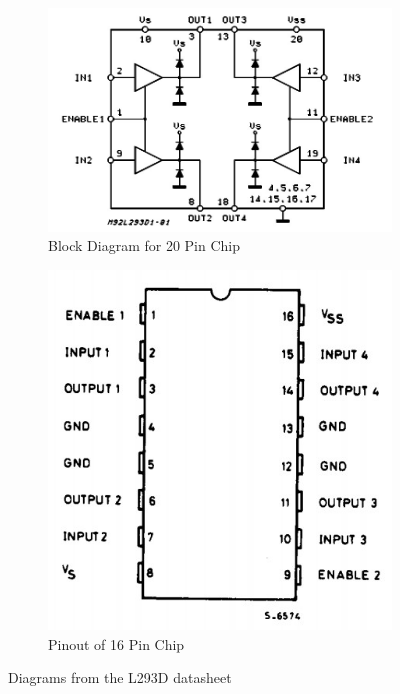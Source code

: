\documentclass[a4paper,12pt]{article}
\begin{document}
\begin{figure}[h]
    \centering
     \begin{subfigure}[b]{0.5\textwidth}
         \centering
         \includegraphics[width=\textwidth]{L293D-block-diagram.jpg}
         \caption{Block Diagram for 20 Pin Chip}
         \label{fig:l293d-block-diagram}
     \end{subfigure}
     \hfill
     \begin{subfigure}[b]{0.3\textwidth}
         \centering
         \includegraphics[width=\textwidth]{L293D-pinout.jpg}
         \caption{Pinout of 16 Pin Chip}
         \label{fig:l293d-pinout}
     \end{subfigure}
     \hfill
        \caption{Diagrams from the L293D datasheet}
        \label{fig:l293d}
\end{figure}
\end{document}
